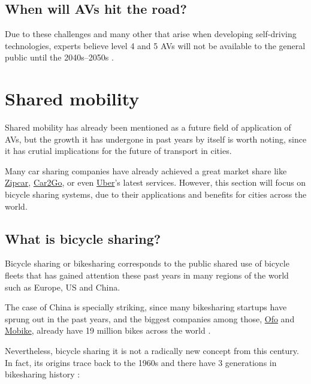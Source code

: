 \subsection{When will AVs hit the road?}

Due to these challenges and many other that arise when developing self-driving technologies, experts believe level 4 and 5 AVs will not be available to the general public until the 2040s--2050s . 

\section{Shared mobility}

Shared mobility has already been mentioned as a future field of application of AVs, but the growth it has undergone in past years by itself is worth noting, since it has crutial implications for the future of transport in cities.

Many car sharing companies have already achieved a great market share like \href{https://www.zipcar.com/}{Zipcar}, \href{https://www.car2go.com/ES/en/}{Car2Go}, or even \href{https://www.uber.com/en-ES/ride/uberpool/}{Uber}'s latest services. However, this section will focus on bicycle sharing systems, due to their applications and benefits for cities across the world.

\subsection{What is bicycle sharing?}

Bicycle sharing or bikesharing corresponds to the public shared use of bicycle fleets that has gained attention these past years  in many regions of the world such as Europe, US and China.

The case of China is specially striking, since many bikesharing startups have sprung out in the past years, and the biggest companies among those, \href{https://www.ofo.com/es/en}{Ofo} and \href{https://mobike.com/global/}{Mobike}, already have 19 million bikes across the world .

Nevertheless, bicycle sharing it is not a radically new concept from this century. In fact, its origins trace back to the 1960s and there have 3 generations in bikesharing history :

